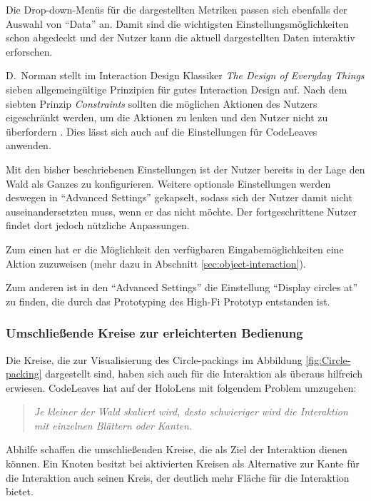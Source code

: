 Die Drop-down-Menüs für die dargestellten Metriken passen sich ebenfalls der Auswahl von "`Data"' an. Damit sind die wichtigsten Einstellungsmöglichkeiten schon abgedeckt und der Nutzer kann die aktuell dargestellten Daten interaktiv erforschen.

D.\ Norman stellt im Interaction Design Klassiker \textit{The Design of Everyday Things} sieben allgemeingültige Prinzipien für gutes Interaction Design auf. Nach dem siebten Prinzip \textit{Constraints} sollten die möglichen Aktionen des Nutzers eigeschränkt werden, um die Aktionen zu lenken und den Nutzer nicht zu überfordern \cite{norman2013design}. Dies lässt sich auch auf die Einstellungen für CodeLeaves anwenden.

Mit den bisher beschriebenen Einstellungen ist der Nutzer bereits in der Lage den Wald als Ganzes zu konfigurieren. Weitere optionale Einstellungen werden deswegen in "`Advanced Settings"' gekapselt, sodass sich der Nutzer damit nicht auseinandersetzten muss, wenn er das nicht möchte. Der fortgeschrittene Nutzer findet dort jedoch nützliche Anpassungen.

Zum einen hat er die Möglichkeit den verfügbaren Eingabemöglichkeiten eine Aktion zuzuweisen (mehr dazu in Abschnitt \ref{sec:object-interaction}).

Zum anderen ist in den "`Advanced Settings"' die Einstellung "`Display circles at"' zu finden, die durch das Prototyping des High-Fi Prototyp entstanden ist.

\subsubsection*{Umschließende Kreise zur erleichterten Bedienung}
Die Kreise, die zur Visualisierung des Circle-packings im Abbildung \ref{fig:Circle-packing} dargestellt sind, haben sich auch für die Interaktion als überaus hilfreich erwiesen. CodeLeaves hat auf der HoloLens mit folgendem Problem umzugehen:

\begin{quote}
  \textit{Je kleiner der Wald skaliert wird, desto schwieriger wird die Interaktion mit einzelnen Blättern oder Kanten.}
\end{quote}

Abhilfe schaffen die umschließenden Kreise, die als Ziel der Interaktion dienen können. Ein Knoten besitzt bei aktivierten Kreisen als Alternative zur Kante für die Interaktion auch seinen Kreis, der deutlich mehr Fläche für die Interaktion bietet.

